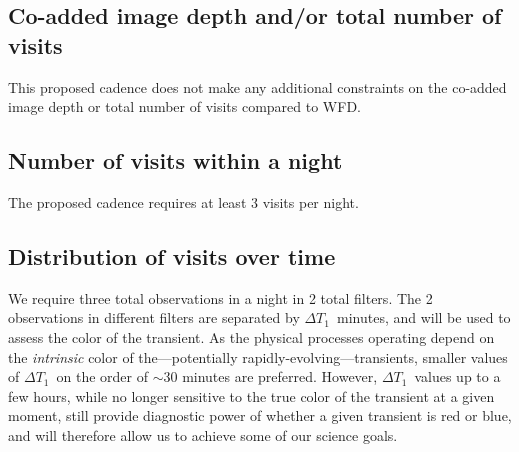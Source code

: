 \documentclass[12pt, letterpaper]{article}
\newcommand{\dtone}{\ensuremath{\Delta T_1}}
\begin{document}
\subsection{Co-added image depth and/or total number of visits}

\noindent This proposed cadence does not make any additional constraints on the co-added image depth or total number of visits compared to WFD. 


\subsection{Number of visits within a night}

\noindent The proposed cadence requires at least 3 visits per night.

\subsection{Distribution of visits over time}

We require three total observations in a night in 2 total filters. The 2 observations in different filters are separated by \dtone\ minutes, and will be used to assess the color of the transient. As the physical processes operating depend on the \emph{intrinsic} color of the---potentially rapidly-evolving---transients, smaller values of \dtone\ on the order of $\sim$30 minutes are preferred. However, \dtone\ values up to a few hours, while no longer sensitive to the true color of the transient at a given moment, still provide diagnostic power of whether a given transient is red or blue, and will therefore allow us to achieve some of our science goals.
\end{document}
